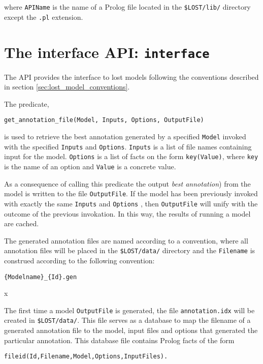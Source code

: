 \documentclass{book}
\begin{document}
\noindent
where \texttt{APIName} is the name of a Prolog file located
in the \texttt{\$LOST/lib/} directory except the \texttt{.pl}
extension.

\section{The interface API: \texttt{interface}}

The API provides the interface to lost models following the
conventions described in section \ref{sec:lost_model_conventions}.

The predicate,
\begin{verbatim}
get_annotation_file(Model, Inputs, Options, OutputFile)
\end{verbatim}

is used to retrieve the best annotation generated by a specified
\texttt{Model} invoked with the specified \texttt{Inputs} and
\texttt{Options}. \texttt{Inputs} is a list of file names containing 
input for the model. \texttt{Options} is a list of facts on the form
\texttt{key(Value)}, where \texttt{key} is the name of an
option and \texttt{Value} is a concrete value.

As a consequence of calling this predicate the output \emph{best
  annotation}) from the model is written to the file
\texttt{OutputFile}. If the model has been previously invoked with exactly
the same \texttt{Inputs} and \texttt{Options} , then
\texttt{OutputFile} will unify with the outcome of the previous
invokation. In this way, the results of running a model are cached.

The generated annotation files are named according to a convention, where 
all annotation files will be placed in the \texttt{\$LOST/data/}
directory and the \texttt{Filename} is construed according to the following convention:
\begin{verbatim}
{Modelname}_{Id}.gen
\end{verbatim}x

The first time a model \texttt{OutputFile} is generated, the file
\texttt{annotation.idx} will be created in \texttt{\$LOST/data/}. This file
serves as a database to map the filename of a generated annotation
file to the model, input files and options that generated
the particular annotation. This database file contains Prolog facts 
of the form
\begin{verbatim}
fileid(Id,Filename,Model,Options,InputFiles).
\end{verbatim}
\end{document}
